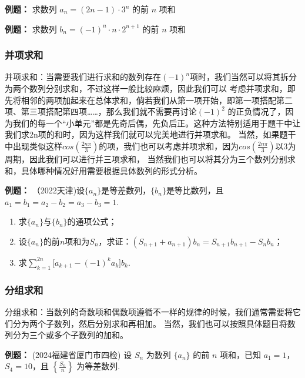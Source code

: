 \documentclass{article}
\begin{document}
\noindent\textbf{例题： }求数列 \(a_n = (2n-1) \cdot 3^n\) 的前 \(n\) 项和
\vspace{10\baselineskip}

\noindent\textbf{例题： }求数列 \(b_n = (-1)^n \cdot n \cdot 2^{n+1}\) 的前 \(n\) 项和
\vspace{10\baselineskip}
\newpage

\subsubsection{并项求和}

并项求和：当需要我们进行求和的数列存在$(-1)^n$项时，我们当然可以将其拆分为两个数列分别求和，不过这样一般比较麻烦，因此我们可以
考虑并项求和，即先将相邻的两项加起来在总体求和，倘若我们从第一项开始，即第一项搭配第二项、第三项搭配第四项……，那么我们就不需要再讨论$(-1)^2$
的正负情况了，因为我们的每一个“小单元”都是先奇后偶，先负后正。这种方法特别适用于题干中让我们求2n项的和时，因为这样我们就可以完美地进行并项求和。
当然，如果题干中出现类似这样$cos(\frac{2n\pi}{3})$的项，我们也可以考虑并项求和，因为$cos(\frac{2n\pi}{3}) $以3为周期，因此我们可以进行并三项求和，
当然我们也可以将其分为三个数列分别求和，具体哪种情况好用需要根据具体数列的形式分析。
\vspace{2\baselineskip}

\noindent \textbf{例题： } （2022天津)设$\{a_n\}$是等差数列，$\{b_n\}$是等比数列，且$a_1 = b_1 = a_2 - b_2 = a_3 - b_3 = 1$.

\begin{enumerate}
    \item 求$\{a_n\}$与$\{b_n\}$的通项公式；
    \item 设$\{a_n\}$的前$n$项和为$S_n$，求证：$(S_{n+1} + a_{n+1})b_n = S_{n+1}b_{n+1} - S_nb_n$；
    \item 求$\sum_{k=1}^{2n}\bigl[a_{k+1} - (-1)^k a_k\bigr]b_k$.
\end{enumerate}

\newpage

\subsubsection{分组求和}

分组求和：当数列的奇数项和偶数项遵循不一样的规律的时候，我们通常需要将它们分为两个子数列，然后分别求和再相加。
当然，我们也可以按照具体题目将数列分为三个或多个子数列的加和。
\vspace{2\baselineskip}

\noindent \textbf{例题： } (2024福建省厦门市四检) 设 \(S_n\) 为数列 \(\{a_n\}\) 的前 \(n\) 项和，已知 \(a_1 = 1\)，\(S_4 = 10\)，且 \(\left\{\frac{S_n}{n}\right\}\) 为等差数列.
\end{document}
